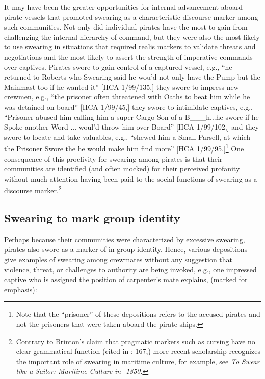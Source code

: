   It may have been the greater opportunities for internal advancement aboard pirate vessels that promoted swearing as a characteristic discourse marker among such communities. Not only did individual pirates have the most to gain from challenging the internal hierarchy of command, but they were also the most likely to use swearing in situations that required realis markers to validate threats and negotiations and the most likely to assert the strength of imperative commands over captives. Pirates swore to gain control of a captured vessel, e.g., “he returned to Roberts who Swearing said he wou’d not only have the Pump but the Mainmast too if he wanted it” [HCA 1/99/135,] they swore to impress new crewmen, e.g., “the prisoner often threatened with Oaths to beat him while he was detained on board” [HCA 1/99/45,] they swore to intimidate captives, e.g., “Prisoner abused him calling him a super Cargo Son of a B\_\_\_h...he swore if he Spoke another Word ... woul’d throw him over Board” [HCA 1/99/102,] and they swore to locate and take valuables, e.g., “shewed him a Small Parsell, at which the Prisoner Swore the he would make him find more” [HCA 1/99/95.]\footnote{Note that the “prisoner” of these depositions refers to the accused pirates and not the prisoners that were taken aboard the pirate ships.}  One consequence of this proclivity for swearing among pirates is that their communities are identified (and often mocked) for their perceived profanity without much attention having been paid to the social functions of swearing as a discourse marker.\footnote{Contrary to Brinton’s claim that pragmatic markers such as cursing have no clear grammatical function (cited in \citealt{ClaridgeArnovick2010}: 167,) more recent scholarship recognizes the important role of swearing in maritime culture, for example, see  \textit{To} \textit{Swear} \textit{like} \textit{a} \textit{Sailor:} \textit{Maritime} \textit{Culture} \textit{in} \textit{\citealt{America1750}-1850}.} 

\subsection{\textbf{Swearing} \textbf{to} \textbf{mark} \textbf{group} \textbf{identity}}%

Perhaps because their communities were characterized by excessive swearing, pirates also swore as a marker of in-group identity. Hence, various depositions give examples of swearing among crewmates without any suggestion that violence, threat, or challenges to authority are being invoked, e.g., one impressed captive who is assigned the position of carpenter’s mate explains, (marked for emphasis): 

